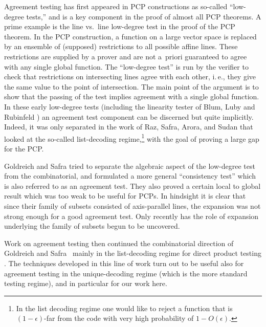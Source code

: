 \documentclass[11pt]{article}
\numberwithin{equation}{section}
\theoremstyle{definition}
\theoremstyle{plain}
\newcommand{\ie}{i.\,e.}
\theoremstyle{plain}
\begin{document}
Agreement testing has first appeared in PCP constructions  \cite{BabaiFL1991,BabaiFLS1991,FeigeGLSS1996,AroraS1998,AroraLMSS1998}  as so-called ``low-degree tests,'' and is a key component in the proof of almost all PCP theorems.
A prime example is the line vs.\ line low-degree test  \cite{GemmellLRSW1991,RubinfeldS1996} in the proof of the PCP theorem. In the PCP construction, a function on a large vector space is replaced by an ensemble of (supposed) restrictions to all possible affine lines. These restrictions are supplied by a prover and are not a~priori guaranteed to agree with any single global function. The  ``low-degree test'' is run by the verifier to check that restrictions on intersecting lines agree with each other, \ie, they give the same value to the point of intersection. The main point of the argument is to show that the passing of the test implies agreement with a single global function.
In these early low-degree tests (including the linearity
%
tester  %
of Blum, Luby and Rubinfeld \cite{BlumLR1993}) an agreement test component can be discerned but quite implicitly. Indeed, it was only separated in the
%
work of Raz, Safra, Arora, and Sudan %
%
\cite{RazS1997,AroraS2003} that looked at the so-called list-decoding regime,\footnote{In the list decoding regime one would like to reject a function that is $(1-\epsilon)$-far from the code with very
%
high probability  %
of $1-O(\epsilon)$.} with the goal of proving a large gap for the PCP.

Goldreich and Safra \cite{GoldreichS2000} tried to separate the algebraic aspect of the low-degree test from the combinatorial, and formulated a more general ``consistency test'' which is also referred to as an agreement test. They also proved a certain local to global result which was too weak to be useful for PCPs. In hindsight it is clear that since their family of subsets consisted of
%
axis-parallel  %
lines, the expansion was not strong enough for a good agreement test.
Only recently \cite{DinurK2017, DiksteinD2019}
%
has %
the role of expansion underlying the family of subsets %
begun to be uncovered. 

Work on agreement testing then continued the combinatorial direction of Goldreich and Safra~\cite{GoldreichS2000} mainly in the list-decoding regime
for direct product testing
\cite{DinurR2006,DinurG2008,ImpagliazzoKW2012,DinurS2014-dp,DinurN2017}. The techniques developed in this line of work turn out to be useful also for agreement testing in the unique-decoding regime (which is the more standard testing regime), and in particular for our work here.
\end{document}
